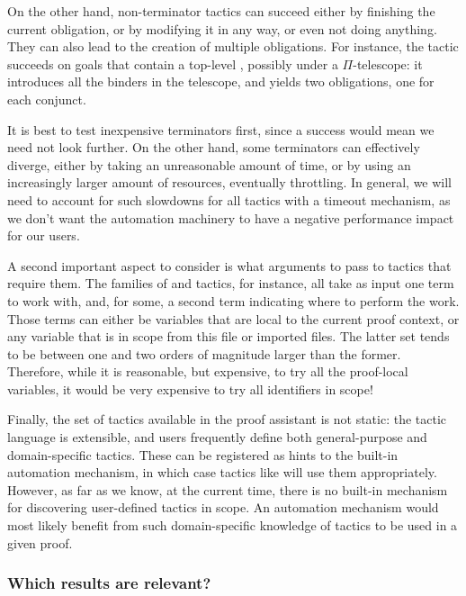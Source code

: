 On the other hand, non-terminator tactics can succeed either by finishing the
current obligation, or by modifying it in any way, or even not doing anything.
They can also lead to the creation of multiple obligations.  For instance, the
 tactic succeeds on goals that contain a top-level
, possibly under a $\Pi$-telescope: it introduces all the
binders in the telescope, and yields two obligations, one for each conjunct.

It is best to test inexpensive terminators first, since a success would mean we
need not look further.  On the other hand, some terminators can effectively
diverge, either by taking an unreasonable amount of time, or by using an
increasingly larger amount of resources, eventually throttling.  In general, we
will need to account for such slowdowns for all tactics with a timeout
mechanism, as we don't want the automation machinery to have a negative
performance impact for our users.

A second important aspect to consider is what arguments to pass to tactics that
require them.  The families of  and 
tactics, for instance, all take as input one term to work with, and, for some, a
second term indicating where to perform the work.  Those terms can either be
variables that are local to the current proof context, or any variable that is
in scope from this file or imported files.  The latter set tends to be between
one and two orders of magnitude larger than the former.  Therefore, while it is
reasonable, but expensive, to try all the proof-local variables, it would be
very expensive to try all identifiers in scope!

Finally, the set of tactics available in the \Coq{} proof assistant is not
static: the tactic language is extensible, and users frequently define both
general-purpose and domain-specific tactics.  These can be registered as hints
to the built-in automation mechanism, in which case tactics like
 will use them appropriately.  However, as far as we know, at
the current time, there is no built-in mechanism for discovering user-defined
tactics in scope.  An automation mechanism would most likely benefit from such
domain-specific knowledge of tactics to be used in a given proof.

\subsubsection{Which results are relevant?}

